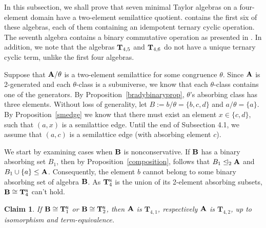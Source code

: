 \documentclass[11pt]{amsart}
\newcommand{\m}[1]{\mathbf{\uppercase{#1}}}
\newcommand{\n}{\scriptscriptstyle{\mathsf{N}}}
\newtheorem{lem}[thm]{Lemma}
\theoremstyle{definition}
\theoremstyle{remark}
\theoremstyle{plain}
\newtheorem{claim}[thm]{Claim}
\def\T{\mathbf{T}}
\begin{document}
In this subsection, we shall prove that seven minimal Taylor algebras on a four-element domain have a two-element semilattice quotient.  contains the first six of these algebras, each of them containing an idempotent ternary cyclic operation. The seventh algebra contains a binary commutative operation as presented in . In addition, we note that the algebras ${\m T}_{4,5}$ and ${\m T}_{4,6}$ do not have a unique ternary cyclic term, unlike the first four algebras.

Suppose that $\m a/\theta$ is a two-element semilattice for some congruence $\theta$. Since $\m a$ is 2-generated and each $\theta$-class is a subuniverse, we know that each $\theta$-class contains one of the generators.
By Proposition~\ref{bradybinaryprop}, $\theta$'s absorbing class has three elements. Without loss of generality, let $B:=b/\theta=\{b,c,d\}$ and $a/\theta=\{a\}$. By Proposition~\ref{smedge} we know that there must exist an element $x\in \{c,d\}$, such that $(a,x)$ is a semilattice edge. Until the end of Subsection 4.1, we assume that $(a,c)$ is a semilattice edge (with absorbing element $c$).



We start by examining cases when $\m b$ is nonconservative. If $\m B$ has a binary absorbing set $B_1$, then by Proposition~\ref{composition}, follows that $B_1\trianglelefteq_2 {\m A}$ and $B_1\cup \{a\}\leq {\m A}$. Consequently, the element $b$ cannot belong to some binary absorbing set of algebra ${\m B}$. As ${\m T}_4^{\n}$ is the union of its 2-element absorbing subsets, $\m b\cong {\m T}_4^{\n}$ can't hold.



\begin{claim}
If ${\m B}\cong {\m T}_1^{\n}$ or ${\m B}\cong {\m T}_2^{\n}$, then ${\m A}$ is $ {\T}_{4,1}$, respectively ${\m A}$ is $ {\T}_{4,2}$, up to isomorphism and term-equivalence.
\end{claim}
\end{document}
